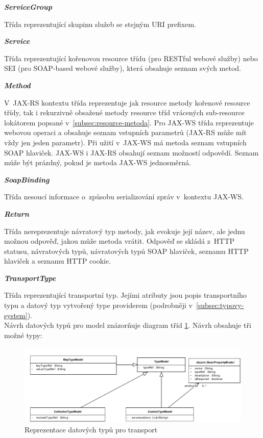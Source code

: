\documentclass[11pt,twoside,a4paper]{book}
\begin{document}
\textbf{\textit{ServiceGroup}}

Třída reprezentující skupinu služeb se stejným URI prefixem.

\textbf{\textit{Service}}

Třída reprezentující kořenovou resource třídu (pro RESTful webové služby) nebo
SEI (pro SOAP-based webové služby), která obsahuje seznam svých metod.

\textbf{\textit{Method}}

V~JAX-RS kontextu třída reprezentuje jak resource metody kořenové resource
třídy, tak i rekurzivně obsažené metody resource tříd vrácených sub-resource
lokátorem popsané v~\ref{subsec:resource-metoda}.
Pro JAX-WS třída reprezentuje webovou operaci a obsahuje seznam vstupních
parametrů (JAX-RS může mít vždy jen jeden parametr). Při užití v~JAX-WS má
metoda seznam vstupních SOAP hlaviček. JAX-WS i JAX-RS obsahují seznam možností
odpovědí.
Seznam může být prázdný, pokud je metoda JAX-WS jednosměrná.

\textbf{\textit{SoapBinding}}

Třída nesoucí informace o~způsobu serializování zpráv v~kontextu JAX-WS.

\textbf{\textit{Return}}

Třída nereprezentuje návratový typ metody, jak evokuje její název, ale jednu
možnou odpověď, jakou může metoda vrátit. Odpověď se skládá z~HTTP statusu, návratových typů,
návratových typů SOAP hlaviček, seznamu HTTP hlaviček a seznamu HTTP cookie.

\textbf{\textit{TransportType}}

Třída reprezentující transportní typ. Jejími atributy jsou popis transportního
typu a datový typ vytvořený type providerem (podrobněji
v~\ref{subsec:typovy-system}).
\mbox{}\\
Návrh datových typů pro model znázorňuje diagram tříd \ref{fig:typovy-system}.
Návrh obsahuje tři možné typy:

\begin{figure}[h]
\begin{center}
\includegraphics[width=13cm]{images-pdf/TypeSystem.pdf}
\caption{Reprezentace datových typů pro transport}
\label{fig:typovy-system}
\end{center}
\end{figure}
\end{document}
